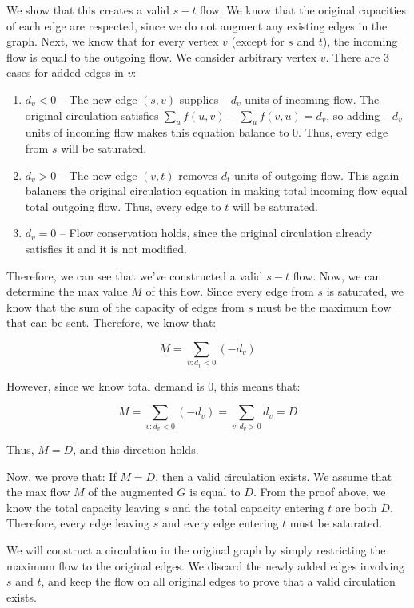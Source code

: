 \documentclass[11pt]{article}
\begin{document}
\begin{enumerate}
We show that this creates a valid $s-t$ flow. We know that the original capacities of each edge are respected, 
since we do not augment any existing edges in the graph. Next, we know that for every vertex $v$ (except for $s$ and $t$), 
the incoming flow is equal to the outgoing flow. We consider arbitrary vertex $v$. There are $3$ cases for added edges in $v$:

\begin{enumerate}[label=(\arabic*), noitemsep]
    \item $d_v < 0$ -- The new edge $(s, v)$ supplies $-d_v$ units of incoming flow. The original circulation satisfies 
    $\sum_{u} f(u,v) - \sum_{u} f(v,u) = d_v$, so adding $-d_v$ units of incoming flow makes this equation balance to $0$. 
    Thus, every edge from $s$ will be saturated.
    \item $d_v > 0$ -- The new edge $(v, t)$ removes $d_t$ units of outgoing flow. This again balances the original circulation equation 
    in making total incoming flow equal total outgoing flow. 
    Thus, every edge to $t$ will be saturated.
    \item $d_v = 0$ -- Flow conservation holds, since the original circulation already satisfies it and it is not modified.
\end{enumerate}

Therefore, we can see that we've constructed a valid $s-t$ flow. Now, we can determine the max value $M$ of this flow. 
Since every edge from $s$ is saturated, we know that the sum of the capacity of edges from $s$ must be the maximum flow that can be sent. 
Therefore, we know that:

$$M = \sum_{v: d_v < 0} (-d_v)$$

However, since we know total demand is $0$, this means that:

$$M = \sum_{v: d_v < 0} (-d_v) = \sum_{v: d_v > 0} d_v = D$$

Thus, $M = D$, and this direction holds.

\medbreak

Now, we prove that: If $M = D$, then a valid circulation exists. We assume that the max flow $M$ of the augmented $G$ is equal to $D$. 
From the proof above, we know the total capacity leaving $s$ and the total capacity entering $t$ are both $D$. 
Therefore, every edge leaving $s$ and every edge entering $t$ must be saturated. 

We will construct a circulation in the original graph by simply restricting the maximum flow to the original edges. 
We discard the newly added edges involving $s$ and $t$, and keep the flow on all original edges to prove that a valid circulation exists. 


\end{enumerate}
\end{document}
